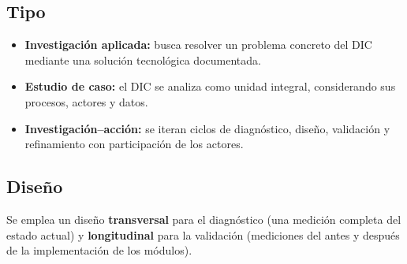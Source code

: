 \subsection{Tipo}
\begin{itemize}[leftmargin=1.4cm, itemsep=3pt]
  \item \textbf{Investigación aplicada:} busca resolver un problema concreto del
        \ac{DIC} mediante una solución tecnológica documentada.
  \item \textbf{Estudio de caso:} el \ac{DIC} se analiza como unidad integral,
        considerando sus procesos, actores y datos.
  \item \textbf{Investigación--acción:} se iteran ciclos de diagnóstico, diseño,
        validación y refinamiento con participación de los actores.
\end{itemize}

\subsection{Diseño}
Se emplea un diseño \textbf{transversal} para el diagnóstico (una medición
completa del estado actual) y \textbf{longitudinal} para la validación (mediciones
del antes y después de la implementación de los módulos).

